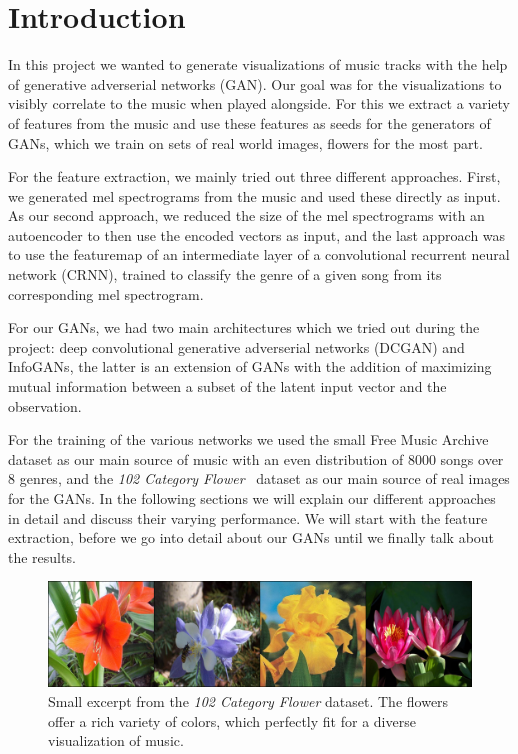 \chapter{Introduction}
    In this project we wanted to generate visualizations of music tracks with the help of generative adverserial networks (GAN). Our goal was for the visualizations to visibly correlate to the music when played alongside.
    For this we extract a variety of features from the music and use these features as seeds for the generators of GANs, which we train on sets of real world images, flowers for the most part.

    For the feature extraction, we mainly tried out three different approaches. First, we generated mel spectrograms from the music and used these directly as input. As our second approach, we reduced the size of the mel spectrograms with an autoencoder to then use the encoded vectors as input, and the last approach was to use the featuremap of an intermediate layer of a convolutional recurrent neural network (CRNN), trained to classify the genre of a given song from its corresponding mel spectrogram.

    For our GANs, we had two main architectures which we tried out during the project: deep convolutional generative adverserial networks (DCGAN) and InfoGANs, the latter is an extension of GANs with the addition of maximizing mutual information between a subset of the latent input vector and the observation.

    For the training of the various networks we used the small Free Music Archive~\cite{FMA} dataset as our main source of music with an even distribution of 8000 songs over 8 genres, and the \textit{102 Category Flower}~\cite{102flower} dataset as our main source of real images for the GANs. In the following sections we will explain our different approaches in detail and discuss their varying performance. We will start with the feature extraction, before we go into detail about our GANs until we finally talk about the results.

    \begin{figure}
        \centering
        \includegraphics[width=\textwidth]{images/real_samples}
        \caption{Small excerpt from the \textit{102 Category Flower} dataset. The flowers offer a rich variety of colors, which perfectly fit for a diverse visualization of music.}
        \label{flowers}
    \end{figure}
